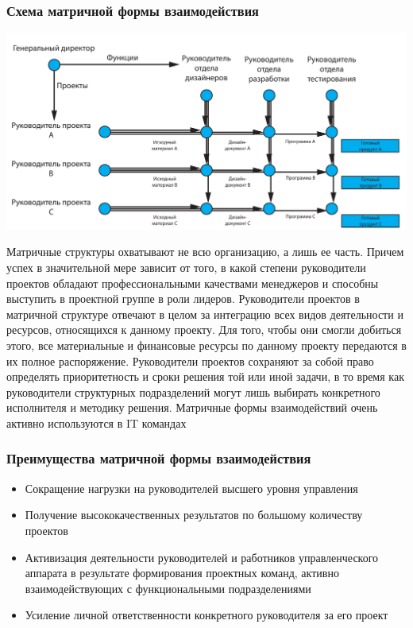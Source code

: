 \documentclass{../industrial-development}
\begin{document}
\begin{frame} \frametitle{Схема матричной формы взаимодействия}

\begin{block}{}
	\centerline{\includegraphics[width=1\textwidth]{matrix.pdf}}
\end{block}

\end{frame}

\lecturenotes
Матричные структуры охватывают не всю организацию, а лишь ее часть. Причем успех в значительной мере зависит от того, в какой степени руководители проектов обладают профессиональными качествами менеджеров и способны выступить в проектной группе в роли лидеров.
Руководители проектов в матричной структуре отвечают в целом за интеграцию всех видов деятельности и ресурсов, относящихся к данному проекту. Для того, чтобы они смогли добиться этого, все материальные и финансовые ресурсы по данному проекту передаются в их полное распоряжение. Руководители проектов сохраняют за собой право определять приоритетность и сроки решения той или иной задачи, в то время как руководители структурных подразделений могут лишь выбирать конкретного исполнителя и методику решения.
Матричные формы взаимодействий очень активно используются в IT  командах

\begin{frame} \frametitle{Преимущества матричной формы взаимодействия}
  
  \begin{itemize}
  \item Сокращение нагрузки на руководителей высшего уровня управления 
  \item Получение высококачественных результатов по большому количеству проектов
  \item Активизация деятельности руководителей и работников управленческого аппарата в результате формирования проектных команд, активно взаимодействующих с функциональными подразделениями
  \item Усиление личной ответственности конкретного руководителя за его проект
  \end{itemize}
\end{frame}
\end{document}
